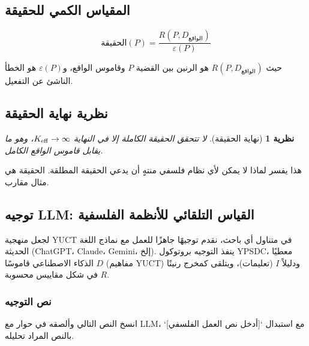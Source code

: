 \documentclass[11pt,a4paper]{article}
\newtheorem{theorem}{نظرية}[section]
\newcommand{\eps}{\varepsilon}
\begin{document}
	\subsection{المقياس الكمي للحقيقة}
	
	\begin{equation}
		\text{الحقيقة}(P) = \frac{R(P, D_{\text{الواقع}})}{\eps(P)}
	\end{equation}
	
	حيث \(R(P, D_{\text{الواقع}})\) هو الرنين بين القضية \(P\) وقاموس الواقع، و\(\eps(P)\) هو الخطأ الناشئ عن التفعيل.
	
	\subsection{نظرية نهاية الحقيقة}
	
	\begin{theorem}[نهاية الحقيقة]
		لا تتحقق الحقيقة الكاملة إلا في النهاية \(\Keff \to \infty\)، وهو ما يقابل قاموس الواقع الكامل.
	\end{theorem}
	
	هذا يفسر لماذا لا يمكن لأي نظام فلسفي منتهٍ أن يدعي الحقيقة المطلقة. الحقيقة هي مثال مقارب.
	
	\subsection{توجيه LLM: القياس التلقائي للأنظمة الفلسفية}
	\label{sec:llm-prompt}
	
	لجعل منهجية YUCT في متناول أي باحث، نقدم توجيهًا جاهزًا للعمل مع نماذج اللغة الحديثة (ChatGPT، Claude، Gemini، إلخ). ينفذ التوجيه بروتوكول YPSDC، معطيًا الذكاء الاصطناعي قاموسًا \(D\) (مفاهيم YUCT) ودليلاً \(I\) (تعليمات)، ويتلقى كمخرج رنينًا \(R\) في شكل مقاييس محسوبة.
	
	\subsubsection{نص التوجيه}
	
	انسخ النص التالي وألصقه في حوار مع LLM، مع استبدال `[أدخل نص العمل الفلسفي]` بالنص المراد تحليله.
	
\end{document}
